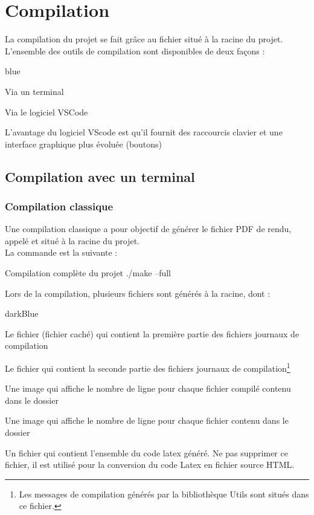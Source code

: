 \chapter{Compilation}

La compilation du projet se fait grâce au fichier  situé à la racine du projet.\\
L'ensemble des outils de compilation sont disponibles de deux façons :

\begin{items}{blue}{\Bullet}
    \item Via un terminal
    \item Via le logiciel VSCode
\end{items}

L'avantage du logiciel VScode est qu'il fournit des raccourcis clavier et une interface graphique plus évoluée (boutons)


\section{Compilation avec un terminal}


\subsection{Compilation classique}

Une compilation classique a pour objectif de générer le fichier PDF de rendu, appelé  et situé à la 
racine du projet.\\

La commande est la suivante :

\begin{Bash}{Compilation complète du projet}
./make --full
\end{Bash}

Lors de la compilation, plusieurs fichiers sont générés à la racine, dont : 

\begin{items}{darkBlue}{\Triangle}
    \item Le fichier  (fichier caché) qui contient la première partie des fichiers journaux de compilation
    \item Le fichier  qui contient la seconde partie des fichiers journaux de compilation\footnote{Les messages de compilation générés par la bibliothèque Utils sont situés dans ce fichier.}
    \item Une image  qui affiche le nombre de ligne pour chaque fichier compilé contenu dans le dossier 
    \item Une image  qui affiche le nombre de ligne pour chaque fichier contenu dans le dossier 
    \item Un fichier  qui contient l'ensemble du code latex généré. Ne pas supprimer ce fichier, il est utilisé pour la conversion du code Latex en fichier source HTML.
\end{items}

